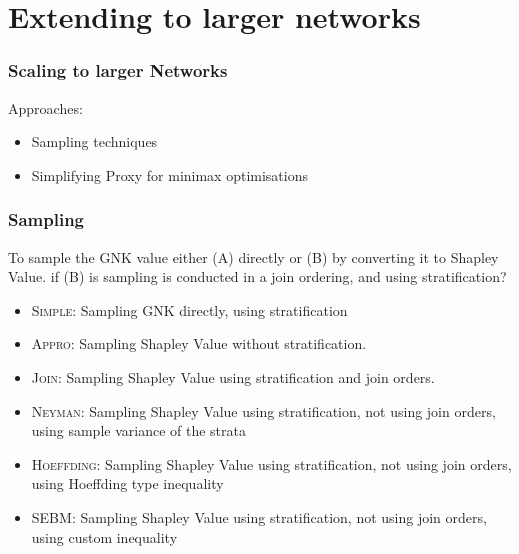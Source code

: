 \section{Extending to larger networks}

\begin{frame}
\frametitle{Scaling to larger Networks}
Approaches:
\begin{itemize}
\item	Sampling techniques
\item	Simplifying Proxy for minimax optimisations
\end{itemize}
\end{frame}

\begin{frame}
\frametitle{Sampling}
To sample the GNK value either (A) directly or (B) by converting it to Shapley Value.
if (B) is sampling is conducted in a join ordering, and using stratification?

\begin{itemize}
\item	\textsc{Simple}: Sampling GNK directly, using stratification
\item	\textsc{Appro}: Sampling Shapley Value without stratification. \cite{DBLP:journals/cor/CastroGT09}
\item	\textsc{Join}: Sampling Shapley Value using stratification and join orders. \cite{CASTRO2017180}
\item	\textsc{Neyman}: Sampling Shapley Value using stratification, not using join orders, using sample variance of the strata \cite{CASTRO2017180,1938.10503378}
\item	\textsc{Hoeffding}: Sampling Shapley Value using stratification, not using join orders, using Hoeffding type inequality \cite{2013arXiv1306.4265M}
\item	\textsc{SEBM}: Sampling Shapley Value using stratification, not using join orders, using custom inequality
\end{itemize}
\end{frame}

\begin{frame}

\end{frame}

\begin{frame}

\end{frame}



